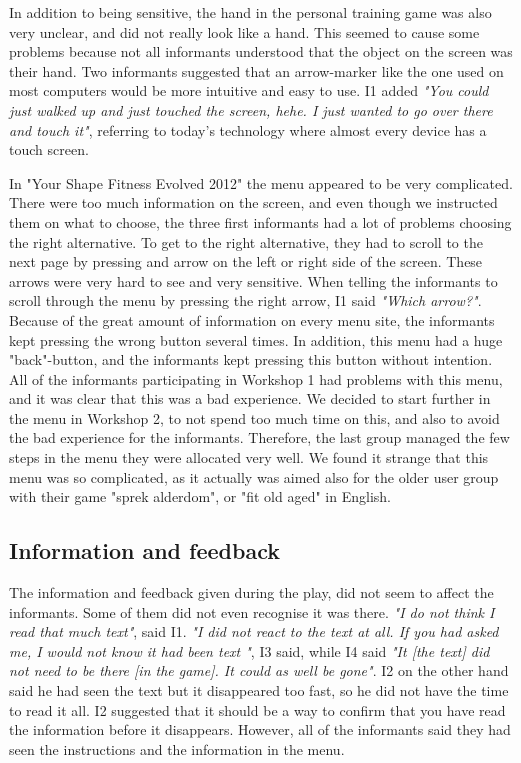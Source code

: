 In addition to being sensitive, the hand in the personal training game was also very unclear, and did not really look like a hand. This seemed to cause some problems because not all informants understood that the object on the screen was their hand. Two informants suggested that an arrow-marker like the one used on most computers would be more intuitive and easy to use. I1 added \emph{"You could just walked up and just touched the screen, hehe. I just wanted to go over there and touch it"}, referring to today's technology where almost every device has a touch screen. 

In "Your Shape Fitness Evolved 2012" the menu appeared to be very complicated. There were too much information on the screen, and even though we instructed them on what to choose, the three first informants had a lot of problems choosing the right alternative. To get to the right alternative, they had to scroll to the next page by pressing and arrow on the left or right side of the screen. These arrows were very hard to see and very sensitive. When telling the informants to scroll through the menu by pressing the right arrow, I1 said \emph{"Which arrow?"}.  Because of the great amount of information on every menu site, the informants kept pressing the wrong button several times. In addition, this menu had a huge "back"-button, and the informants kept pressing this button without intention. All of the informants participating in Workshop 1 had problems with this menu, and it was clear that this was a bad experience.  We decided to start further in the menu in Workshop 2, to not spend too much time on this, and also to avoid the bad experience for the informants. Therefore, the last group managed the few steps in the menu they were allocated very well. We found it strange that this menu was so complicated, as it actually was aimed also for the older user group with their game "sprek alderdom", or "fit old aged" in English. 

\subsection{Information and feedback}
The information and feedback given during the play, did not seem to affect the informants. Some of them did not even recognise it was there. \emph{"I do not think I read that much text"}, said I1. \emph{"I did not react to the text at all. If you had asked me, I would not know it had been text
"}, I3 said, while I4 said \emph{"It [the text] did not need to be there [in the game]. It could as well be gone"}. I2 on the other hand said he had seen the text but it disappeared too fast, so he did not have the time to read it all. I2 suggested that it should be a way to confirm that you have read the information before it disappears. However, all of the informants said they had seen the instructions and the information in the menu. 

